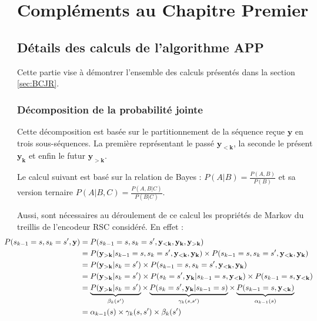 
\appendix
\chapter{Compléments au Chapitre Premier}
\section{Détails des calculs de l'algorithme APP}\label{append:app}
Cette partie vise à démontrer l'ensemble des calculs présentés dans la section \ref{sec:BCJR}.
\subsection{Décomposition de la probabilité jointe} 
Cette décomposition est basée sur le partitionnement de la séquence reçue $\mathbf{y}$ en trois sous-séquences. La première représentant le passé $ \mathbf{y_{<k}}$, la seconde le présent $\mathbf{y_{k}} $ et enfin le futur $ \mathbf{y_{>k}}$.

Le calcul suivant est basé sur la relation de Bayes : $P(A|B) = \frac{P(A,B)}{P(B)}$ et sa version ternaire $P(A|B,C) = \frac{P(A,B|C)}{P(B|C)}$.

Aussi, sont nécessaires au déroulement de ce calcul les propriétés de Markov du treillis de l'encodeur RSC considéré. En effet :
\begin{align*}
	\hspace*{-4ex}
	P(s_{k-1}=s, s_{k}=s',\mathbf{y}) & = P(s_{k-1}=s, s_{k}=s',\mathbf{y_{<k}},\mathbf{y_{k}},\mathbf{y_{>k}})                                                                                                                             \\
	                                  & = P(\mathbf{y_{>k}}|s_{k-1}=s, s_{k}=s',\mathbf{y_{<k}},\mathbf{y_{k}})\times P(s_{k-1}=s, s_{k}=s',\mathbf{y_{<k}},\mathbf{y_{k}})                                                                 \\
	                                  & =P(\mathbf{y_{>k}}|s_{k}=s')\times P(s_{k-1}=s, s_{k}=s',\mathbf{y_{<k}},\mathbf{y_{k}})                                                                                                            \\
	                                  & =P(\mathbf{y_{>k}}|s_{k}=s')\times P(s_{k}=s',\mathbf{y_{k}}|s_{k-1}=s,\mathbf{y_{<k}})\times P(s_{k-1}=s,\mathbf{y_{<k}})                                                                          \\
	                                  & = \underbrace{P(\mathbf{y_{>k}}|s_{k}=s')}_{\beta_k(s')}\times \underbrace{P(s_{k}=s',\mathbf{y_{k}}|s_{k-1}=s)}_{\gamma_k(s,s')}\times \underbrace{P(s_{k-1}=s,\mathbf{y_{<k}})}_{\alpha_{k-1}(s)} \\
	                                  & = \alpha_{k-1}(s) \times \gamma_k(s,s') \times \beta_k(s')                                                                                                                                          
\end{align*}

